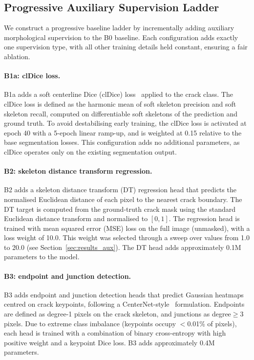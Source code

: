 \documentclass[preprint,12pt]{elsarticle}
\begin{document}
\subsection{Progressive Auxiliary Supervision Ladder}
\label{sec:aux_ladder}

We construct a progressive baseline ladder by incrementally adding auxiliary morphological supervision to the B0 baseline. Each configuration adds exactly one supervision type, with all other training details held constant, ensuring a fair ablation.

\paragraph{B1a: clDice loss.}
B1a adds a soft centerline Dice (clDice) loss~\cite{shit2021cldice} applied to the crack class. The clDice loss is defined as the harmonic mean of soft skeleton precision and soft skeleton recall, computed on differentiable soft skeletons of the prediction and ground truth. To avoid destabilising early training, the clDice loss is activated at epoch 40 with a 5-epoch linear ramp-up, and is weighted at 0.15 relative to the base segmentation losses. This configuration adds no additional parameters, as clDice operates only on the existing segmentation output.

\paragraph{B2: skeleton distance transform regression.}
B2 adds a skeleton distance transform (DT) regression head that predicts the normalised Euclidean distance of each pixel to the nearest crack boundary. The DT target is computed from the ground-truth crack mask using the standard Euclidean distance transform and normalised to $[0, 1]$. The regression head is trained with mean squared error (MSE) loss on the full image (unmasked), with a loss weight of 10.0. This weight was selected through a sweep over values from 1.0 to 20.0 (see Section~\ref{sec:results_aux}). The DT head adds approximately 0.1M parameters to the model.

\paragraph{B3: endpoint and junction detection.}
B3 adds endpoint and junction detection heads that predict Gaussian heatmaps centred on crack keypoints, following a CenterNet-style~\cite{zhou2019centernet} formulation. Endpoints are defined as degree-1 pixels on the crack skeleton, and junctions as degree$\geq$3 pixels. Due to extreme class imbalance (keypoints occupy $<$0.01\% of pixels), each head is trained with a combination of binary cross-entropy with high positive weight and a keypoint Dice loss. B3 adds approximately 0.4M parameters.
\end{document}
